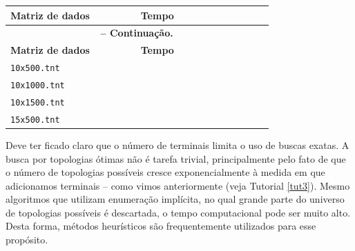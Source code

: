 \begin{refsection}
\begin{center}
\begin{longtable}{lcccccc}
\hline\hline \textbf{Matriz de dados} & \textbf{Tempo}\\
\endfirsthead

\multicolumn{6}{c}{{\bfseries \tablename\ \thetable{} -- Continuação.}}\\
\hline\hline \textbf{Matriz de dados} & \textbf{Tempo}\\
\endhead
\hline \hline
\endlastfoot
\hline
\texttt{10x500.tnt} & ~~~~~~~~~~~~~~~~~~~~~~~~\\
\texttt{10x1000.tnt} & ~~~~~~~~~~~~~~~~~~~~~~~~\\
\texttt{10x1500.tnt} & ~~~~~~~~~~~~~~~~~~~~~~~~\\
\texttt{15x500.tnt} & ~~~~~~~~~~~~~~~~~~~~~~~~\\

\end{longtable}
\end{center}



Deve ter ficado claro que o número de terminais limita o uso de buscas exatas. A busca por topologias ótimas não é tarefa trivial, principalmente pelo fato de que o número de topologias possíveis cresce exponencialmente à medida em que adicionamos terminais -- como vimos anteriormente (veja Tutorial \ref{tut3}). Mesmo algoritmos que utilizam enumeração implícita, no qual grande parte do universo de topologias possíveis é descartada, o tempo computacional pode ser muito alto. Desta forma, métodos heurísticos são frequentemente utilizados para esse propósito.


\end{refsection}
